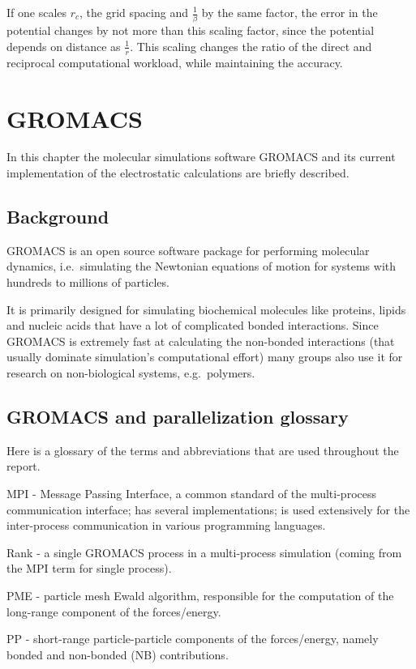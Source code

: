 \documentclass[12pt,a4paper,notitlepage]{report}
\begin{document}
If one scales $r_c$, the grid spacing and $\frac{1}{\beta}$ by the same factor, the error in the potential changes by not more than this scaling factor, since the potential depends on distance as $\frac{1}{r}$. This scaling changes the ratio of the direct and reciprocal computational workload, while maintaining the accuracy.


\newpage
\chapter{GROMACS}

In this chapter the molecular simulations software GROMACS and its current implementation of the electrostatic calculations are briefly described.

\section{Background}

GROMACS \cite{gromacshome} is an open source software package for performing molecular dynamics, i.e.~simulating the Newtonian equations of motion for systems with hundreds to millions of particles. 

It is primarily designed for simulating biochemical molecules like proteins, lipids and nucleic acids that have a lot of complicated bonded interactions. Since GROMACS is extremely fast at calculating the non-bonded interactions (that usually dominate simulation's computational effort) many groups also use it for research on non-biological systems, e.g.~polymers.

\section{GROMACS and parallelization glossary}
Here is a glossary of the terms and abbreviations that are used throughout the report.

MPI - Message Passing Interface, a common standard of the multi-process communication interface; has several implementations; is used extensively for the inter-process communication in various programming languages.

Rank - a single GROMACS process in a multi-process simulation (coming from the MPI term for single process).

PME - particle mesh Ewald algorithm, responsible for the computation of the long-range component of the forces/energy.

PP - short-range particle-particle components of the forces/energy, namely bonded and non-bonded (NB) contributions.
\end{document}
